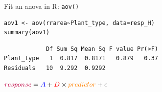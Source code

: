\documentclass{beamer}
\makeatletter
\newenvironment{kframe}{%
 \def\at@end@of@kframe{}%
 \ifinner\ifhmode%
  \def\at@end@of@kframe{\end{minipage}}%
  \begin{minipage}{\columnwidth}%
 \fi\fi%
 \def\FrameCommand##1{\hskip\@totalleftmargin \hskip-\fboxsep
 \colorbox{shadecolor}{##1}\hskip-\fboxsep
     \hskip-\linewidth \hskip-\@totalleftmargin \hskip\columnwidth}%
 \MakeFramed {\advance\hsize-\width
   \@totalleftmargin\z@ \linewidth\hsize
   \@setminipage}}%
 {\par\unskip\endMakeFramed%
 \at@end@of@kframe}
\newenvironment{knitrout}{}{} %
\makeatother
\begin{document}
\begin{frame}[fragile]{Fit an anova in R: \texttt{aov()}}

\begin{knitrout}
\color{fgcolor}\begin{kframe}
\begin{verbatim}
aov1 <- aov(rrarea~Plant_type, data=resp_H)
summary(aov1)
\end{verbatim}
\end{kframe}
\end{knitrout}

\vspace{-0.15cm}
\pause
\begin{knitrout}
\color{fgcolor}\begin{kframe}
\footnotesize
\begin{verbatim}
            Df Sum Sq Mean Sq F value Pr(>F)
Plant_type   1  0.817  0.8171   0.879   0.37
Residuals   10  9.292  0.9292  
\end{verbatim}
\end{kframe}
\end{knitrout}

\pause
${\color{purple}{response}} = {\color{blue}{A}} + {\color{red}{D}} \times {\color{orange}{predictor}} + {\color{gray}{\epsilon}}$

\end{frame}
\end{document}
